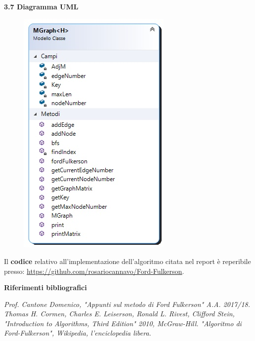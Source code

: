 \documentclass{article}
\begin{document}
\begin{flushleft}
\begin{Large}\textbf{3.7 Diagramma UML}\end{Large}
\newline
\normalsize
\begin{figure}[ht!]
\begin{center}
  \includegraphics[width=7.5cm]{ClassDiagram.jpg}\\
\end{center}
\end{figure}
\end{flushleft}
\hfill{}
\newpage
\begin{flushleft}
Il \textbf{codice} relativo all'implementazione dell'algoritmo citata nel report è reperibile presso: \underline{\url{https://github.com/rosariocannavo/Ford-Fulkerson}}.
\end{flushleft}
\vspace{0pt}
\begin{flushleft}
\begin{large}\textbf{Riferimenti bibliografici}\end{large}
\newline
\newline
\textit{Prof. Cantone Domenico, "Appunti sul metodo di Ford Fulkerson" A.A. 2017/18.}
\newline
\newline
\textit{Thomas H. Cormen, Charles E. Leiserson, Ronald L. Rivest, Clifford Stein, "Introduction to Algorithms, Third Edition" 2010, McGraw-Hill.  }
\newline
\newline
\textit{"Algoritmo di Ford-Fulkerson", Wikipedia, l'enciclopedia libera.}
\end{flushleft}
\end{document}
